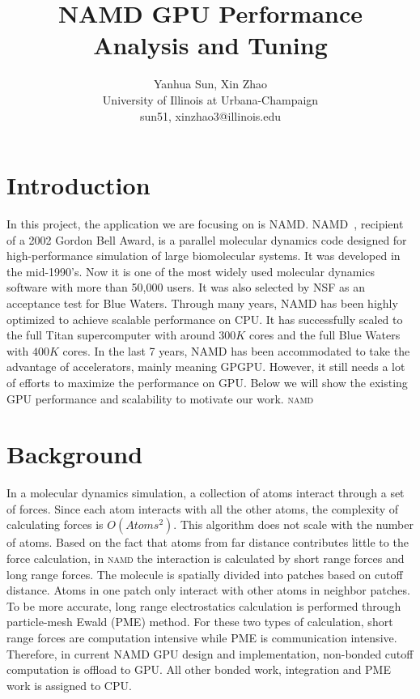\documentclass[11pt,onecolumn]{article}
\newcommand{\namd}{\textsc{namd}}
\begin{document}

\title{ NAMD GPU Performance Analysis and Tuning}

\author{
  Yanhua Sun, Xin Zhao\\
  University of Illinois at Urbana-Champaign\\
  {sun51, xinzhao3}@illinois.edu
}

\date{}
\maketitle

\lstset{
  basicstyle=\ttfamily,
  showstringspaces=false
}

%
%

\section{Introduction}
In this project, the application we are focusing on is NAMD.
NAMD~\cite{NamdSC02}, recipient of a 2002 Gordon Bell Award, is a parallel molecular 
dynamics code designed for high-performance simulation of large biomolecular systems.
It was developed in the mid-1990's. Now it is one of the most widely used molecular dynamics 
software with more than 50,000 users. It was also selected by NSF as an acceptance test
for Blue Waters.
Through many years, NAMD has been highly optimized to achieve scalable performance on CPU.
It has successfully scaled to the full Titan supercomputer with around $300K$ cores and 
the full Blue Waters with $400K$ cores. In the last 7 years, NAMD has been accommodated
to take the advantage of accelerators, mainly meaning GPGPU. However, it still needs a lot of 
efforts to maximize the performance on GPU. Below we will show the existing GPU performance and 
scalability to motivate our work. 
\namd{}

\section{Background}
In a molecular dynamics simulation, a collection of atoms interact through a set of forces. 
Since each atom interacts with all the other atoms, the complexity of calculating forces
is $O(Atoms^2)$. This algorithm does not scale with the number of atoms. Based on the fact that
atoms from far distance contributes little to the force calculation, in \namd{} the interaction is
calculated by short range forces and long range forces. The molecule  is spatially divided into 
patches based on cutoff distance. Atoms in one patch only interact with other atoms in neighbor patches.
To be more accurate, long range electrostatics calculation is performed through particle-mesh Ewald (PME) method.
For these two types of calculation, short range forces are computation intensive while PME is communication intensive.
Therefore, in current NAMD GPU design and implementation, non-bonded cutoff computation is offload to GPU.
All other bonded work, integration and PME work is assigned to CPU.
\end{document}
